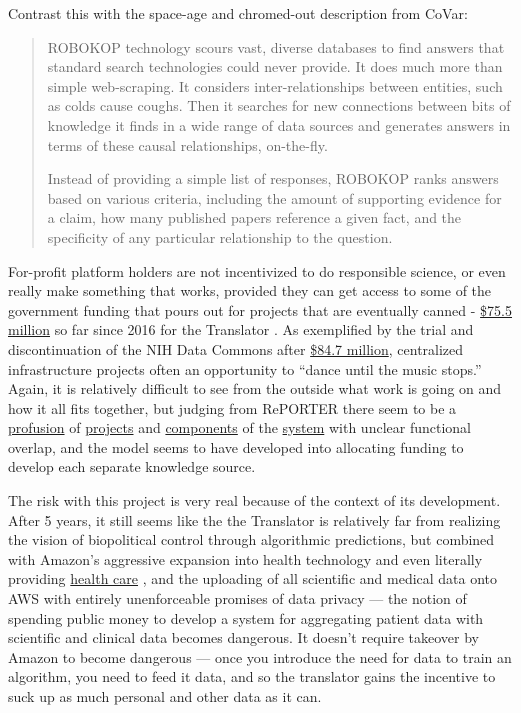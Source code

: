\documentclass[notoc]{tufte-book}
\begin{document}
Contrast this with the space-age and chromed-out description from CoVar:

\begin{quote}
ROBOKOP technology scours vast, diverse databases to find answers that
standard search technologies could never provide. It does much more than
simple web-scraping. It considers inter-relationships between entities,
such as colds cause coughs. Then it searches for new connections between
bits of knowledge it finds in a wide range of data sources and generates
answers in terms of these causal relationships, on-the-fly.

Instead of providing a simple list of responses, ROBOKOP ranks answers
based on various criteria, including the amount of supporting evidence
for a claim, how many published papers reference a given fact, and the
specificity of any particular relationship to the question.
\end{quote}

For-profit platform holders are not incentivized to do responsible
science, or even really make something that works, provided they can get
access to some of the government funding that pours out for projects
that are eventually canned -
\href{https://reporter.nih.gov/search/kDJ97zGUFEaIBIltUmyd_Q/projects?sort_field=FiscalYear\&sort_order=desc}{\$75.5
million} so far since 2016 for the Translator \citep{RePORTRePORTERBiomedical2021} . As exemplified by the trial and
discontinuation of the NIH Data Commons after
\href{https://reporter.nih.gov/search/H4LxgMGK9kGw6SeWCom85Q/projects?shared=true}{\$84.7
million}, centralized infrastructure projects often an opportunity to
``dance until the music stops.'' Again, it is relatively difficult to
see from the outside what work is going on and how it all fits together,
but judging from RePORTER there seem to be a
\href{https://reporter.nih.gov/project-details/10332268}{profusion} of
\href{https://reporter.nih.gov/project-details/10333468}{projects} and
\href{https://reporter.nih.gov/project-details/10333460}{components} of
the \href{https://reporter.nih.gov/project-details/10330627}{system}
with unclear functional overlap, and the model seems to have developed
into allocating funding to develop each separate knowledge source.

The risk with this project is very real because of the context of its
development. After 5 years, it still seems like the the Translator is
relatively far from realizing the vision of biopolitical control through
algorithmic predictions, but combined with Amazon's aggressive expansion
into health technology \citep{AWSAnnouncesAWS2021}  and even
literally providing \href{https://amazon.care/}{health care} \citep{lermanAmazonBuiltIts2021} , and the uploading of all scientific and
medical data onto AWS with entirely unenforceable promises of data
privacy \citep{quinnYouCanTrust2021}  --- the notion of spending
public money to develop a system for aggregating patient data with
scientific and clinical data becomes dangerous. It doesn't require
takeover by Amazon to become dangerous --- once you introduce the need
for data to train an algorithm, you need to feed it data, and so the
translator gains the incentive to suck up as much personal and other
data as it can.
\end{document}
